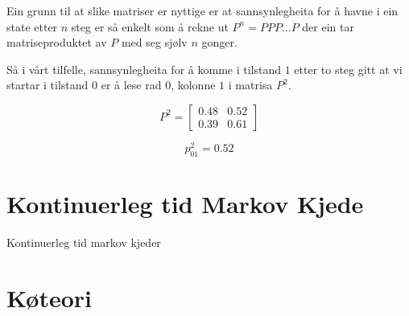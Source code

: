 Ein grunn til at slike matriser er nyttige er at sannsynlegheita for å havne i ein state etter $n$ steg er så enkelt som å rekne ut $P^n = PPP\dots P$ der ein tar matriseproduktet av $P$ med seg sjølv $n$ gonger.

Så i vårt tilfelle, sannsynlegheita for å komme i tilstand $1$ etter to steg gitt at vi startar i tilstand $0$ er å lese rad $0$, kolonne $1$ i matrisa $P^2$. 

\begin{equation}
    P^2 = 
    \begin{bmatrix}
    0.48 & 0.52 \\
    0.39 & 0.61
    \end{bmatrix}
\end{equation}

\begin{equation}
    p_{01}^2 = 0.52
\end{equation}



\section{Kontinuerleg tid Markov Kjede}
Kontinuerleg tid markov kjeder 

\section{Køteori}